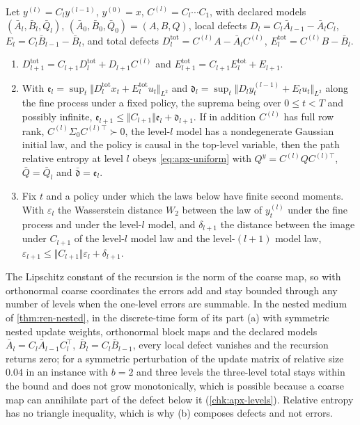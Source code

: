 \begin{theorem}\label{thm:apx-levels}
Let $y^{(l)}=C_ly^{(l-1)}$, $y^{(0)}=x$, $C^{(l)}=C_l\cdots C_1$, with declared models $(\bar A_l,\bar B_l,\bar Q_l)$, $(\bar A_0,\bar B_0,\bar Q_0)=(A,B,Q)$, local defects $D_l=C_l\bar A_{l-1}-\bar A_lC_l$, $E_l=C_l\bar B_{l-1}-\bar B_l$, and total defects $D^{\mathrm{tot}}_l=C^{(l)}A-\bar A_lC^{(l)}$, $E^{\mathrm{tot}}_l=C^{(l)}B-\bar B_l$.
\begin{enumerate}
\item[(a)] $D^{\mathrm{tot}}_{l+1}=C_{l+1}D^{\mathrm{tot}}_l+D_{l+1}C^{(l)}$ and $E^{\mathrm{tot}}_{l+1}=C_{l+1}E^{\mathrm{tot}}_l+E_{l+1}$.
\item[(b)] With $\mathfrak e_l=\sup_t\Vert D^{\mathrm{tot}}_lx_t+E^{\mathrm{tot}}_lu_t\Vert_{L^2}$ and $\mathfrak d_{l}=\sup_t\Vert D_{l}y^{(l-1)}_t+E_{l}u_t\Vert_{L^2}$ along the fine process under a fixed policy, the suprema being over $0\le t<T$ and possibly infinite, $\mathfrak e_{l+1}\le\Vert C_{l+1}\Vert\mathfrak e_l+\mathfrak d_{l+1}$. If in addition $C^{(l)}$ has full row rank, $C^{(l)}\Sigma_0C^{(l)\top}\succ0$, the level-$l$ model has a nondegenerate Gaussian initial law, and the policy is causal in the top-level variable, then the path relative entropy at level $l$ obeys \cref{eq:apx-uniform} with $Q^y=C^{(l)}QC^{(l)\top}$, $\bar Q=\bar Q_l$ and $\bar{\mathfrak d}=\mathfrak e_l$.
\item[(c)] Fix $t$ and a policy under which the laws below have finite second moments. With $\varepsilon_l$ the Wasserstein distance $W_2$ between the law of $y^{(l)}_t$ under the fine process and under the level-$l$ model, and $\delta_{l+1}$ the distance between the image under $C_{l+1}$ of the level-$l$ model law and the level-$(l+1)$ model law, $\varepsilon_{l+1}\le\Vert C_{l+1}\Vert\varepsilon_l+\delta_{l+1}$.
\end{enumerate}
\end{theorem}

The Lipschitz constant of the recursion is the norm of the coarse map, so with orthonormal coarse coordinates the errors add and stay bounded through any number of levels when the one-level errors are summable. In the nested medium of \cref{thm:ren-nested}, in the discrete-time form of its part (a) with symmetric nested update weights, orthonormal block maps and the declared models $\bar A_l=C_l\bar A_{l-1}C_l^\top$, $\bar B_l=C_l\bar B_{l-1}$, every local defect vanishes and the recursion returns zero; for a symmetric perturbation of the update matrix of relative size $0.04$ in an instance with $b=2$ and three levels the three-level total stays within the bound and does not grow monotonically, which is possible because a coarse map can annihilate part of the defect below it (\cref{chk:apx-levels}). Relative entropy has no triangle inequality, which is why (b) composes defects and not errors.

